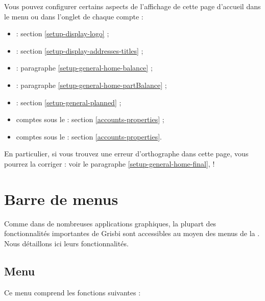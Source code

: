 Vous pouvez configurer certains aspects de l'affichage de cette page d'accueil dans le menu  ou dans l'onglet  de chaque compte :
\begin{itemize}
	 \item {} : section \vref{setup-display-logo} ;
	 \item {} : section \vref{setup-display-addresses-titles} ;
	 \item {} : paragraphe \vref{setup-general-home-balance} ;
	 \item {} : paragraphe \vref{setup-general-home-partBalance} ;
	 \item {} : section \vref{setup-general-planned} ;
	 \item comptes sous le  : section \vref{accounts-properties} ;
	 \item comptes sous le  : section  \vref{accounts-properties}.
\end{itemize}

En particulier, si vous trouvez une erreur d’orthographe dans cette page, vous pourrez la corriger : voir le paragraphe \vref{setup-general-home-final},  !

\ifIllustration
\newpage
\fi

\section{Barre de menus\label{home-menus}}


Comme dans de nombreuses applications graphiques, la plupart des fonctionnalités importantes de Grisbi sont accessibles au moyen des menus de la . Nous détaillons ici leurs fonctionnalités.


\subsection{Menu \label{home-menus-file}}

Ce menu comprend les fonctions suivantes :


